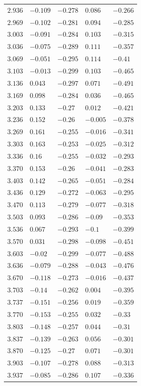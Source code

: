 \begin{table}[h]
\begin{tabular}{rllll}
$2.936$&$-0.109$&$-0.278$&$0.086$&$-0.266$\\
$2.969$&$-0.102$&$-0.281$&$0.094$&$-0.285$\\
$3.003$&$-0.091$&$-0.284$&$0.103$&$-0.315$\\
$3.036$&$-0.075$&$-0.289$&$0.111$&$-0.357$\\
$3.069$&$-0.051$&$-0.295$&$0.114$&$-0.41$\\
$3.103$&$-0.013$&$-0.299$&$0.103$&$-0.465$\\
$3.136$&$0.043$&$-0.297$&$0.071$&$-0.491$\\
$3.169$&$0.098$&$-0.284$&$0.036$&$-0.465$\\
$3.203$&$0.133$&$-0.27$&$0.012$&$-0.421$\\
$3.236$&$0.152$&$-0.26$&$-0.005$&$-0.378$\\
$3.269$&$0.161$&$-0.255$&$-0.016$&$-0.341$\\
$3.303$&$0.163$&$-0.253$&$-0.025$&$-0.312$\\
$3.336$&$0.16$&$-0.255$&$-0.032$&$-0.293$\\
$3.370$&$0.153$&$-0.26$&$-0.041$&$-0.283$\\
$3.403$&$0.142$&$-0.265$&$-0.051$&$-0.284$\\
$3.436$&$0.129$&$-0.272$&$-0.063$&$-0.295$\\
$3.470$&$0.113$&$-0.279$&$-0.077$&$-0.318$\\
$3.503$&$0.093$&$-0.286$&$-0.09$&$-0.353$\\
$3.536$&$0.067$&$-0.293$&$-0.1$&$-0.399$\\
$3.570$&$0.031$&$-0.298$&$-0.098$&$-0.451$\\
$3.603$&$-0.02$&$-0.299$&$-0.077$&$-0.488$\\
$3.636$&$-0.079$&$-0.288$&$-0.043$&$-0.476$\\
$3.670$&$-0.118$&$-0.273$&$-0.016$&$-0.437$\\
$3.703$&$-0.14$&$-0.262$&$0.004$&$-0.395$\\
$3.737$&$-0.151$&$-0.256$&$0.019$&$-0.359$\\
$3.770$&$-0.153$&$-0.255$&$0.032$&$-0.33$\\
$3.803$&$-0.148$&$-0.257$&$0.044$&$-0.31$\\
$3.837$&$-0.139$&$-0.263$&$0.056$&$-0.301$\\
$3.870$&$-0.125$&$-0.27$&$0.071$&$-0.301$\\
$3.903$&$-0.107$&$-0.278$&$0.088$&$-0.313$\\
$3.937$&$-0.085$&$-0.286$&$0.107$&$-0.336$\\

\end{tabular}
\end{table}
